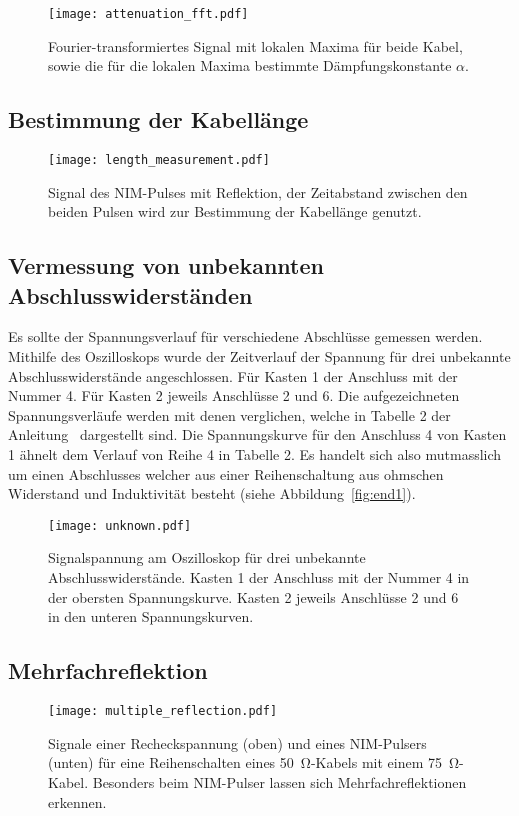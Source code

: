 \begin{figure}
  \centering
  \texttt{[image: attenuation\_fft.pdf]}
  \caption{%
    Fourier-transformiertes Signal mit lokalen Maxima für beide Kabel, sowie die für die lokalen Maxima bestimmte Dämpfungskonstante $α$.
  }\label{fig:attenuation_fft}
\end{figure}

\subsection{Bestimmung der Kabellänge}

\begin{figure}
  \centering
  \texttt{[image: length\_measurement.pdf]}
  \caption{%
    Signal des NIM-Pulses mit Reflektion, der Zeitabstand zwischen den beiden Pulsen wird zur Bestimmung der Kabellänge genutzt.
  }\label{fig:length}
\end{figure}

\subsection{Vermessung von unbekannten Abschlusswiderständen}
Es sollte der Spannungsverlauf für verschiedene Abschlüsse gemessen werden. Mithilfe des Oszilloskops wurde der Zeitverlauf der Spannung für
drei unbekannte Abschlusswiderstände angeschlossen. Für Kasten 1 der Anschluss mit der Nummer 4. Für Kasten 2 jeweils Anschlüsse 2 und 6.
Die aufgezeichneten Spannungsverläufe werden mit denen verglichen, welche in Tabelle 2 der Anleitung~\cite{anleitung} dargestellt sind.
Die Spannungskurve für den Anschluss 4 von Kasten 1 ähnelt dem Verlauf von Reihe 4 in Tabelle 2.
Es handelt sich also mutmasslich um einen Abschlusses welcher aus einer Reihenschaltung aus ohmschen Widerstand und Induktivität besteht (siehe
Abbildung~\ref{fig:end1}).



\begin{figure}
  \centering
  \texttt{[image: unknown.pdf]}
  \caption{%
    Signalspannung am Oszilloskop für drei unbekannte Abschlusswiderstände.
    Kasten 1 der Anschluss mit der Nummer 4 in der obersten Spannungskurve. Kasten 2 jeweils Anschlüsse 2 und 6 in den
    unteren Spannungskurven.
  }\label{fig:unknown}
\end{figure}

\subsection{Mehrfachreflektion}

\begin{figure}
  \centering
  \texttt{[image: multiple\_reflection.pdf]}
  \caption{%
    Signale einer Recheckspannung (oben) und eines NIM-Pulsers (unten) für eine Reihenschalten eines \SI{50}{\ohm}-Kabels mit einem \SI{75}{\ohm}-Kabel.
    Besonders beim NIM-Pulser lassen sich Mehrfachreflektionen erkennen.
  }\label{fig:multiple_reflection}
\end{figure}

